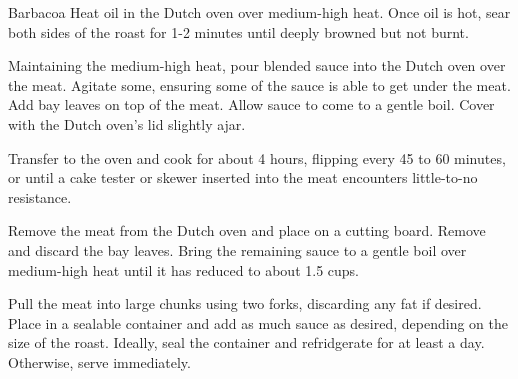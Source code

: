\documentclass[]{article}
\begin{document}
\begin{recipe}{Barbacoa}{}{}
	Heat oil in the Dutch oven over medium-high heat. Once oil is hot, sear both sides of the roast for
	1-2 minutes until deeply browned but not burnt.
	
	Maintaining the medium-high heat, pour blended sauce into the Dutch oven over the meat. Agitate some, ensuring some of the sauce
	is able to get under the meat. Add bay leaves on top of the meat. Allow sauce to come to a gentle boil. Cover with the Dutch
	oven's lid slightly ajar.

	\newstep
	Transfer to the oven and cook for about 4 hours, flipping every 45 to 60 minutes, or until a cake tester or skewer inserted into
	the meat encounters little-to-no resistance. 
	
	\newstep
	Remove the meat from the Dutch oven and place on a cutting board. Remove and discard the bay leaves.
	Bring the remaining sauce to a gentle boil over medium-high heat until it has reduced to about 1.5 cups.

	\newstep
	Pull the meat into large chunks using two forks, discarding any fat if desired. Place in a sealable container and 
	add as much sauce as desired, depending on the size of the roast. Ideally, seal the container and
	refridgerate for at least a day. Otherwise, serve immediately.
	
\end{recipe}

\newpage
\end{document}
